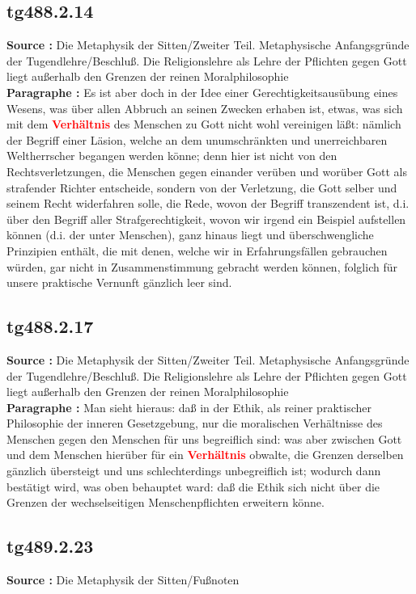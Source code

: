 \documentclass[a4paper,12pt,twoside]{book}
\newcommand{\match}[1]{\textcolor{red}{\textbf{#1}}}
\begin{document}
	\subsection*{tg488.2.14} 
	\textbf{Source : }Die Metaphysik der Sitten/Zweiter Teil. Metaphysische Anfangsgründe der Tugendlehre/Beschluß. Die Religionslehre als Lehre der Pflichten gegen Gott liegt außerhalb den Grenzen der reinen Moralphilosophie\\  
	
	\textbf{Paragraphe : }Es ist aber doch in der Idee einer Gerechtigkeitsausübung eines Wesens, was über allen Abbruch an seinen Zwecken erhaben ist, etwas, was sich mit dem \match{Verhältnis} des Menschen zu Gott nicht wohl vereinigen läßt: nämlich der Begriff einer Läsion, welche an dem unumschränkten und unerreichbaren Weltherrscher begangen werden könne; denn hier ist nicht von den Rechtsverletzungen, die Menschen gegen einander verüben und worüber Gott als strafender Richter entscheide, sondern von der Verletzung, die Gott selber und seinem Recht widerfahren solle, die Rede, wovon der Begriff transzendent ist, d.i. über den Begriff aller Strafgerechtigkeit, wovon wir irgend ein Beispiel aufstellen können (d.i. der unter Menschen), ganz hinaus liegt und überschwengliche Prinzipien enthält, die mit denen, welche wir in Erfahrungsfällen gebrauchen würden, gar nicht in Zusammenstimmung  gebracht werden können, folglich für unsere praktische Vernunft gänzlich leer sind. 
	
	\subsection*{tg488.2.17} 
	\textbf{Source : }Die Metaphysik der Sitten/Zweiter Teil. Metaphysische Anfangsgründe der Tugendlehre/Beschluß. Die Religionslehre als Lehre der Pflichten gegen Gott liegt außerhalb den Grenzen der reinen Moralphilosophie\\  
	
	\textbf{Paragraphe : }Man sieht hieraus: daß in der Ethik, als reiner praktischer Philosophie der inneren Gesetzgebung, nur die moralischen Verhältnisse des Menschen gegen den Menschen für uns begreiflich sind: was aber zwischen Gott und dem Menschen hierüber für ein \match{Verhältnis} obwalte, die Grenzen derselben gänzlich übersteigt und uns schlechterdings unbegreiflich ist; wodurch dann bestätigt wird, was oben behauptet ward: daß die Ethik sich nicht über die Grenzen der wechselseitigen Menschenpflichten erweitern könne. 
	
	\subsection*{tg489.2.23} 
	\textbf{Source : }Die Metaphysik der Sitten/Fußnoten\\  
	
\end{document}
